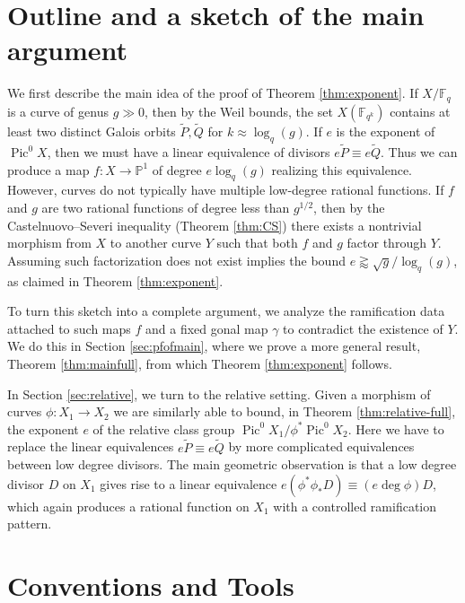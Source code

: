 \documentclass[11pt]{amsart}
\newcommand{\F}{\mathbb{F}}
\newcommand{\PP}{\mathbb{P}}
\DeclareMathOperator{\Pic}{Pic}
\theoremstyle{definition}
\theoremstyle{remark}
\begin{document}
\section{Outline and a sketch of the main argument}

We first describe the main idea of the proof of Theorem \ref{thm:exponent}. If $X/\F_q$ is a curve of genus $g\gg 0$, then by the Weil bounds, the set $X(\F_{q^k})$ contains at least two distinct Galois orbits $\tilde{P}, \tilde{Q}$ for $k \approx \log_q(g)$.  If $e$ is the exponent of $\Pic^0 X$, then we must have a linear equivalence of divisors $e\tilde{P} \equiv e\tilde{Q}$. Thus we can produce a map $f: X \to \PP^1$ of degree $e \log_q(g)$ realizing this equivalence. However, curves do not typically have multiple low-degree rational functions. If $f$ and $g$ are two rational functions of degree less than $g^{1/2}$, then by the Castelnuovo--Severi inequality (Theorem \ref{thm:CS}) there exists a nontrivial morphism from $X$ to another curve $Y$ such that both $f$ and $g$ factor through $Y$. Assuming such factorization does not exist implies the bound $e \gtrapprox \sqrt{g}/\log_q(g)$, as claimed in Theorem \ref{thm:exponent}. 

To turn this sketch into a complete argument, we analyze the ramification data attached to such maps $f$ and a fixed gonal map $\gamma$ to contradict the existence of $Y$. We do this in Section \ref{sec:pfofmain}, where we prove  a more general result, Theorem \ref{thm:mainfull}, from which Theorem \ref{thm:exponent} follows.

In Section \ref{sec:relative}, we turn to the relative setting. Given a morphism of curves $\phi: X_1 \to X_2$ we are similarly able to bound, in Theorem \ref{thm:relative-full}, the exponent $e$ of the relative class group $\Pic^0 X_1/ \phi^* \Pic^0 X_2$. Here we have to replace the linear equivalences $e\tilde{P} \equiv e \tilde{Q}$ by more complicated equivalences between low degree divisors. The main geometric observation is that a low degree divisor $D$ on $X_1$ gives rise to a linear equivalence $e(\phi^*\phi_*D)\equiv (e\deg \phi) D$, which again produces a rational function on $X_1$ with a controlled ramification pattern. 

\section{Conventions and Tools}
\end{document}
